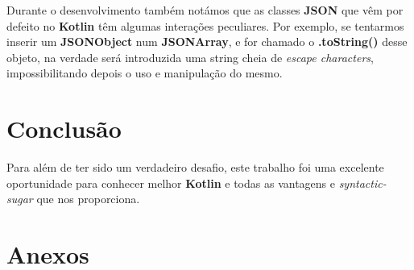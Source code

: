 \documentclass[11pt]{article}
\begin{document}
	Durante o desenvolvimento também notámos que as classes \textbf{JSON} que vêm por defeito no \textbf{Kotlin} têm algumas interações peculiares. Por exemplo, se tentarmos inserir um \textbf{JSONObject} num \textbf{JSONArray}, e for chamado o \textbf{.toString()} desse objeto, na verdade será introduzida uma string cheia de \textit{escape characters}, impossibilitando depois o uso e manipulação do mesmo.
	

	\large
	\section{Conclusão}
	\normalsize
	
	Para além de ter sido um verdadeiro desafio, este trabalho foi uma excelente oportunidade para conhecer melhor \textbf{Kotlin} e todas as vantagens e \textit{syntactic-sugar} que nos proporciona.
	

	\large
	\section{Anexos}
	\normalsize
	
	\listoffigures
	\lstlistoflistings
\end{document}
